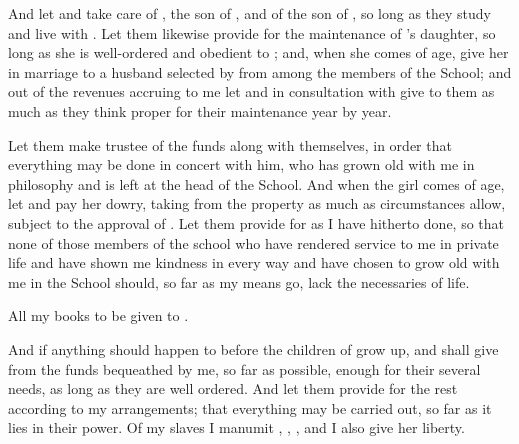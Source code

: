 \documentclass{stex}
\begin{document}
And let  and  take care of , the son of , and of the son of , so long as they study and live with .
Let them likewise provide for the maintenance of 's daughter, so long as she is well-ordered and obedient to ; and, when she comes of age, give her in marriage to a husband selected by  from among the members of the School; and out of the revenues accruing to me let  and  in consultation with  give to them as much as they think proper for their maintenance year by year.

Let them make  trustee of the funds along with themselves, in order that everything may be done in concert with him, who has grown old with me in philosophy and is left at the head of the School.
And when the girl comes of age, let  and  pay her dowry, taking from the property as much as circumstances allow, subject to the approval of .
Let them provide for  as I have hitherto done, so that none of those members of the school who have rendered service to me in private life and have shown me kindness in every way and have chosen to grow old with me in the School should, so far as my means go, lack the necessaries of life.

All my books to be given to .

And if anything should happen to  before the children of  grow up,  and  shall give from the funds bequeathed by me, so far as possible, enough for their several needs, as long as they are well ordered.
And let them provide for the rest according to my arrangements; that everything may be carried out, so far as it lies in their power.
Of my slaves I manumit , , , and I also give  her liberty.
\end{document}
